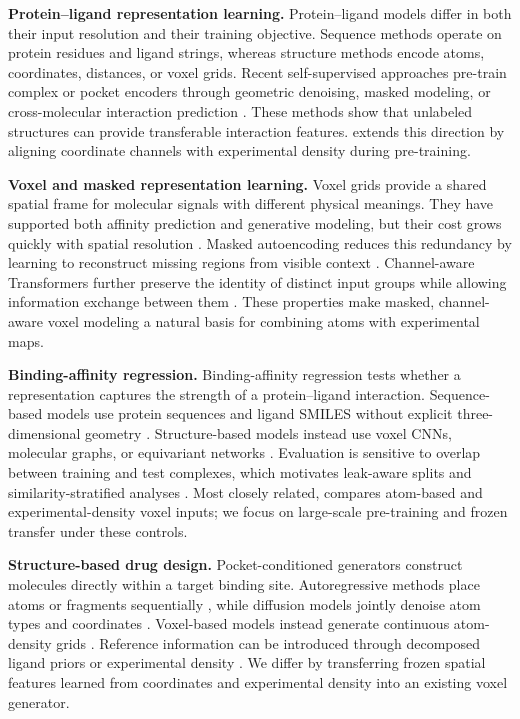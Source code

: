 \textbf{Protein--ligand representation learning.}
Protein--ligand models differ in both their input resolution and their training
objective. Sequence methods operate on protein residues and ligand strings,
whereas structure methods encode atoms, coordinates, distances, or voxel grids.
Recent self-supervised approaches pre-train complex or pocket encoders through
geometric denoising, masked modeling, or cross-molecular interaction prediction
\citep{jin2023dsmbind,feng2024protein,gao2024self}. These methods show that
unlabeled structures can provide transferable interaction features. \ours{}
extends this direction by aligning coordinate channels with experimental density
during pre-training.

\textbf{Voxel and masked representation learning.}
Voxel grids provide a shared spatial frame for molecular signals with different
physical meanings. They have supported both affinity prediction and generative
modeling, but their cost grows quickly with spatial resolution
\citep{stepniewska2018development,pinheiro2024structure}. Masked autoencoding
reduces this redundancy by learning to reconstruct missing regions from visible
context \citep{he2022masked}. Channel-aware Transformers further preserve the
identity of distinct input groups while allowing information exchange between
them \citep{bao2023channel-24a}. These properties make masked, channel-aware
voxel modeling a natural basis for combining atoms with experimental maps.

\textbf{Binding-affinity regression.}
Binding-affinity regression tests whether a representation captures the
strength of a protein--ligand interaction. Sequence-based models use protein
sequences and ligand SMILES without explicit three-dimensional geometry
\citep{ozturk2018deepdta,huang2021moltrans,shenoy2026nesso1}. Structure-based
models instead use voxel CNNs, molecular graphs, or equivariant networks
\citep{stepniewska2018development,kong2026hbgsa,kong2023generalist}. Evaluation
is sensitive to overlap between training and test complexes, which motivates
leak-aware splits and similarity-stratified analyses
\citep{li2026leak,wei2026honestaffinity}. Most closely related,
\citet{suriana2025beyond} compares atom-based and experimental-density voxel
inputs; we focus on large-scale pre-training and frozen transfer under these
controls.

\textbf{Structure-based drug design.}
Pocket-conditioned generators construct molecules directly within a target
binding site. Autoregressive methods place atoms or fragments sequentially
\citep{luo20213d,peng2022pocket2mol}, while diffusion models jointly denoise
atom types and coordinates \citep{guan20233d-5e4,schneuing2024structure}.
Voxel-based models instead generate continuous atom-density grids
\citep{pinheiro20233d-81b,pinheiro2024structure}. Reference information can be
introduced through decomposed ligand priors or experimental density
\citep{guan2024decompdiff,wang2022pocket,li2025electron}. We differ by
transferring frozen spatial features learned from coordinates and experimental
density into an existing voxel generator.
